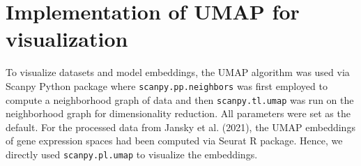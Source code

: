 \section{Implementation of UMAP for visualization}\label{methods:umap}
To visualize datasets and model embeddings, the UMAP algorithm\cite{McInnes2020} was used via Scanpy Python package\cite{Wolf2018} where \texttt{scanpy.pp.neighbors} was first employed to compute a neighborhood graph of data and then \texttt{scanpy.tl.umap} was run on the neighborhood graph for dimensionality reduction. All parameters were set as the default. For the processed data from Jansky et al. (2021), the UMAP embeddings of gene expression spaces had been computed via Seurat R package\cite{Stuart2019,Hao2021}. Hence, we directly used \texttt{scanpy.pl.umap} to visualize the embeddings.

